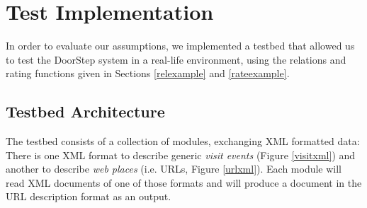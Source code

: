 \documentclass[a4paper,twoside]{danarticle}
\theoremstyle{remark}
\begin{document}
  \section{Test Implementation}
      In order to evaluate our assumptions, we implemented a testbed that 
      allowed us to test the DoorStep system in a real-life environment, using 
      the relations and rating functions given in Sections \ref{relexample} and
      \ref{rateexample}.
    \subsection{Testbed Architecture}
      The testbed consists of a collection of modules, exchanging XML formatted 
      data: There is one XML format to describe generic \textit{visit events} 
      (Figure \ref{visitxml}) and another to describe \textit{web 
      places} (i.e. URLs, Figure \ref{urlxml}). Each module will read XML 
      documents of one of those formats and will produce a document in the URL 
      description format as an output.
      
\end{document}
